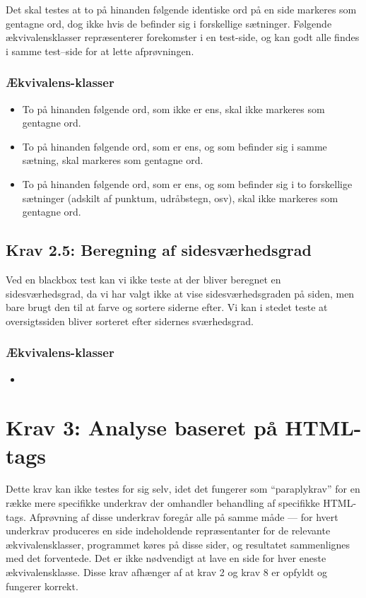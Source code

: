 \documentclass[a4paper,oneside,article]{memoir}
\begin{document}
Det skal testes at to på hinanden følgende identiske ord på en side
markeres som gentagne ord, dog ikke hvis de befinder sig i forskellige
sætninger. Følgende ækvivalensklasser repræsenterer forekomster i en
test-side, og kan godt alle findes i samme test--side for at lette
afprøvningen.

\subsubsection{Ækvivalens-klasser}
\begin{itemize}
\item To på hinanden følgende ord, som ikke er ens, skal ikke
  markeres som gentagne ord.
\item To på hinanden følgende ord, som er ens, og som befinder sig i
  samme sætning, skal markeres som gentagne ord.
\item To på hinanden følgende ord, som er ens, og som befinder sig i
  to forskellige sætninger (adskilt af punktum, udråbstegn, osv), skal
  ikke markeres som gentagne ord.
\end{itemize}

\subsection{Krav 2.5: Beregning af sidesværhedsgrad}
Ved en blackbox test kan vi ikke teste at der bliver beregnet en
sidesværhedsgrad, da vi har valgt ikke at vise sidesværhedsgraden på
siden, men bare brugt den til at farve og sortere siderne efter. Vi
kan i stedet teste at oversigtssiden bliver sorteret efter sidernes
sværhedsgrad.

\subsubsection{Ækvivalens-klasser}
\begin{itemize}
\item 
\end{itemize}

\section{Krav 3: Analyse baseret på HTML-tags}

Dette krav kan ikke testes for sig selv, idet det fungerer som
``paraplykrav'' for en række mere specifikke underkrav der omhandler
behandling af specifikke HTML-tags. Afprøvning af disse underkrav
foregår alle på samme måde --- for hvert underkrav produceres en side
indeholdende repræsentanter for de relevante ækvivalensklasser,
programmet køres på disse sider, og resultatet sammenlignes med det
forventede. Det er ikke nødvendigt at lave en side for hver eneste
ækvivalensklasse. Disse krav afhænger af at krav 2 og krav 8 er
opfyldt og fungerer korrekt.
\end{document}
